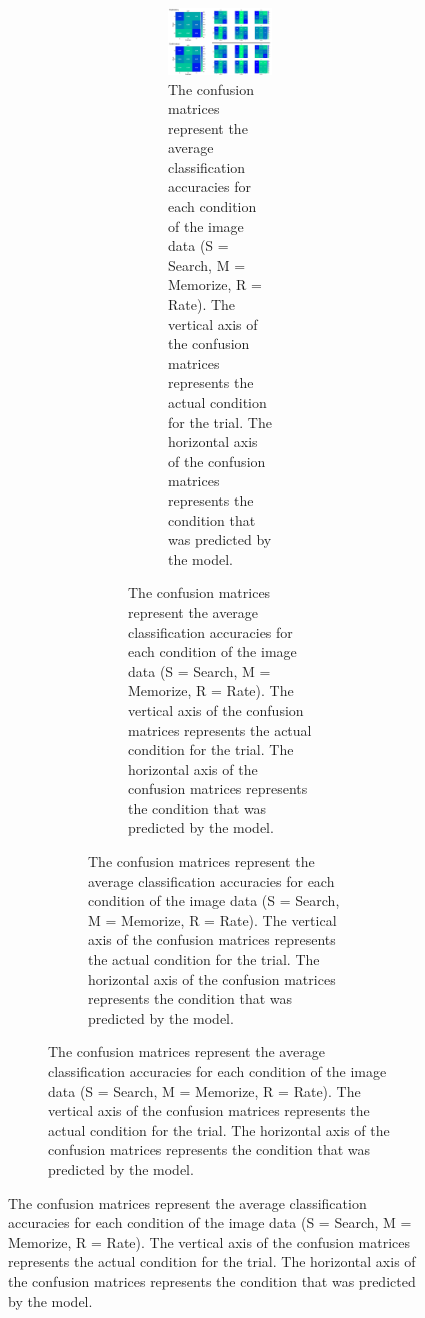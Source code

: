\documentclass[
  english,
  man, donotrepeattitle,floatsintext]{apa6}
\begin{document}
\begin{figure}
\begin{figure}
\begin{figure}
\begin{figure}
\begin{figure}
\centering
\includegraphics{figures/img_conf_matrices.pdf}
\caption{\label{fig:img-conf-matrices}The confusion matrices represent the average classification accuracies for each condition of the image data (S = Search, M = Memorize, R = Rate). The vertical axis of the confusion matrices represents the actual condition for the trial. The horizontal axis of the confusion matrices represents the condition that was predicted by the model.}
\end{figure}


\end{figure}
\end{figure}
\end{figure}
\end{figure}
\end{document}
